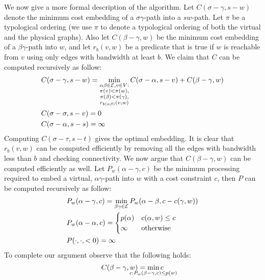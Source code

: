 We now give a more formal description of the algorithm.
Let $C(\sigma-\gamma , s-w)$ denote the
minimum cost embedding of a $\sigma\gamma $-path into a $sw$-path.
Let $\pi$ be a typological ordering 
(we use $\pi$ to denote a typological ordering of 
both the virtual and the physical graphs).
Also let $C(\beta-\gamma, w)$ be the minimum cost embedding of a $\beta\gamma$-path
into $w$, 
and let $r_b(v, w)$ be a predicate that is true if $w$ is reachable from $v$
using only edges with bandwidth at least $b$. 
We claim that $C$ can be computed recursively as follow:
\begin{align*}
&C(\sigma-\gamma , s-w) = 
\min_{\substack{
\alpha\beta \in \mathcal{E},  
v \in V:
\\
\pi(v) < \pi(w),
\\
\pi(\beta ) < \pi(\gamma ), 
\\
r_{b(\alpha\beta)}(v,w)
}}
C(\sigma-\alpha , s-v)
+
C(\beta-\gamma, w)
\\
&C(\sigma-\sigma , s-v) = 0
\\
&C(\sigma-\alpha , s-s) = \infty
\end{align*}
Computing $C(\sigma-\tau , s-t)$ gives the optimal embedding. 
It is clear that $r_b(v,w)$ can be computed efficiently by removing all the edges
with bandwidth less than $b$ and checking connectivity.
We now argue that $C(\beta-\gamma, w)$ can be computed efficiently as well.
Let $P_w(\alpha-\gamma, c)$ 
be the minimum processing required to embed a virtual, 
$\alpha\gamma$-path into $w$ with a cost constraint $c$, 
then $P$ can be computed recursively as follow:
\begin{align*}
&P_{w}(\alpha-\gamma, c) = 
\min_{\beta\gamma  \in \mathcal{E}} P_{w}(\alpha-\beta, c - c(\gamma, w))
\\
&P_w(\alpha-\alpha, c) = 
\begin{cases}
p(\alpha) & c(\alpha, w) \leq c
\\
\infty & \text{otherwise}
\end{cases}
\\
&P(\cdot, \cdot, <0) = \infty
\end{align*}
To complete our argument observe that the following holds:
$$C(\beta-\gamma, w) = \smashoperator{\min_{c : P_w(\beta-\gamma, c) \leq p(w)}}c$$ 


